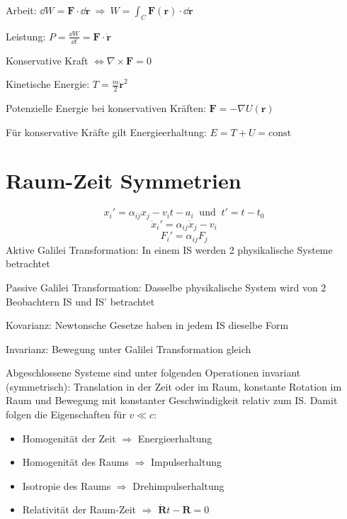 \begin{frameddefn}[Energieerhaltung]
	Arbeit: $\dd W = \mathbf{F} \cdot \dd \mathbf{r} \ \Rightarrow \ W = \int_C \mathbf{F(r)} \cdot \dd \mathbf{r}$
	
	Leistung: $ P = \frac{\dd W}{ \dd t} = \mathbf{F} \cdot \mathbf{\dot r}$
	
	Konservative Kraft $ \iff \nabla \times \mathbf{F} = 0$
	
	Kinetische Energie: $T = \frac{m}{2} \mathbf{\dot r}^2$
	
	Potenzielle Energie bei konservativen Kräften: $\mathbf{F} = - \nabla U(\mathbf{r})$
	
	Für konservative Kräfte gilt Energieerhaltung: $E = T + U = \textrm{const}$
\end{frameddefn}


\section{Raum-Zeit Symmetrien}

\begin{framedprop}
	\[ x_i' = \alpha_{ij} x_j - v_i t - a_i \ \textrm{ und } \ t' = t - t_0 \]
	\[ \dot x_i' = \alpha_{ij} \dot x_j - v_i \]
	\[ F_i' = \alpha_{ij} F_j \]
	Aktive Galilei Transformation: In einem IS werden 2 physikalische Systeme betrachtet
	
	Passive Galilei Transformation: Dasselbe physikalische System wird von 2 Beobachtern IS und IS' betrachtet
	
	Kovarianz: Newtonsche Gesetze haben in jedem IS dieselbe Form
	
	Invarianz: Bewegung unter Galilei Transformation gleich
\end{framedprop}

\begin{framedthm}
	Abgeschlossene Systeme sind unter folgenden Operationen invariant (symmetrisch): Translation in der Zeit oder im Raum, konstante Rotation im Raum und Bewegung mit konstanter Geschwindigkeit relativ zum IS. Damit folgen die Eigenschaften für $v \ll c$:
	
	\begin{itemize}
		\item Homogenität der Zeit $\Rightarrow$ Energieerhaltung
		\item Homogenität des Raums $\Rightarrow$ Impulserhaltung
		\item Isotropie des Raums $\Rightarrow$ Drehimpulserhaltung
		\item Relativität der Raum-Zeit $\Rightarrow$ $\mathbf{\dot R} t - \mathbf{R} = 0$
	\end{itemize}
\end{framedthm}

